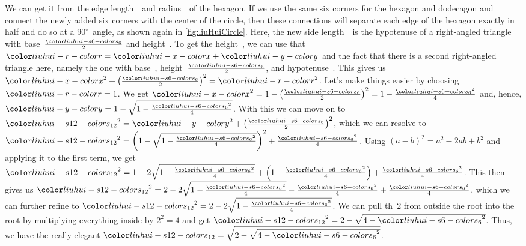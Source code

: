 We can get it from the edge length~\liuhuiss\ and radius~\liuhuir\ of the hexagon.
If we use the same six corners for the hexagon and dodecagon and connect the newly added six corners with the center of the circle, then these connections will separate each edge of the hexagon exactly in half and do so at a $90^\circ$~angle, as shown again in \cref{fig:liuHuiCircle}.
Here, the new side length~\liuhuist\ is the hypotenuse of a right-angled triangle with base~$\frac{\liuhuiss}{2}$ and height~\liuhuiy.
To get the height~\liuhuiy, we can use that~$\liuhuir=\liuhuix+\liuhuiy$ and the fact that there is a second right-angled triangle here, namely the one with base~\liuhuix, height~$\frac{\liuhuiss}{2}$, and hypotenuse~\liuhuir.
This gives us $\liuhuix^2+\left(\frac{\liuhuiss}{2}\right)^2=\liuhuir^2$.
Let's make things easier by choosing~$\liuhuir=1$.
We get $\liuhuix^2=1-\left(\frac{\liuhuiss}{2}\right)^2=1-\frac{\liuhuiss^2}{4}$ and, hence, $\liuhuiy=1-\sqrt{1-\frac{\liuhuiss^2}{4}}$.
With this we can move on to $\liuhuist^2=\liuhuiy^2+\left(\frac{\liuhuiss}{2}\right)^2$, which we can resolve to $\liuhuist^2=\left(1-\sqrt{1-\frac{\liuhuiss^2}{4}}\right)^2+\frac{\liuhuiss^2}{4}$.
Using $(a-b)^2=a^2-2ab+b^2$ and applying it to the first term, we get $\liuhuist^2=1-2\sqrt{1-\frac{\liuhuiss^2}{4}}+\left(1-\frac{\liuhuiss^2}{4}\right)+\frac{\liuhuiss^2}{4}$.
This then gives us $\liuhuist^2=2-2\sqrt{1-\frac{\liuhuiss^2}{4}}-\frac{\liuhuiss^2}{4}+\frac{\liuhuiss^2}{4}$, which we can further refine to $\liuhuist^2=2-2\sqrt{1-\frac{\liuhuiss^2}{4}}$.
We can pull th~$2$ from outside the root into the root by multiplying everything inside by $2^2=4$ and get $\liuhuist^2=2-\sqrt{4-\liuhuiss^2}$.
Thus, we have the really elegant $\liuhuist=\sqrt{2-\sqrt{4-\liuhuiss^2}}$.

